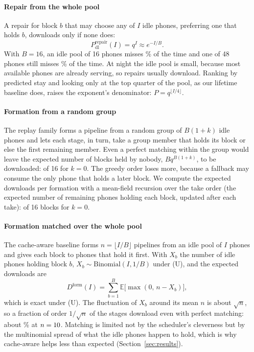\documentclass[preprint,review,12pt,authoryear]{elsarticle}
\begin{document}
\paragraph{Repair from the whole pool} A repair for block $b$ that may choose
any of $I$ idle phones, preferring one that holds $b$, downloads only if none
does:
\begin{equation}
P_{\text{dl}}^{\text{repair}}(I) = q^{I} \approx e^{-I/B}.
\label{eq:repair}
\end{equation}
With $B=16$, an idle pool of 16 phones misses \TMqSixteenPct\% of the time
and one of 48 phones still misses \TMqFortyEightPct\% of the time. At night
the idle pool is small, because most available phones are already serving, so
repairs usually download. Ranking by predicted stay and looking only at the
top quarter of the pool, as our lifetime baseline does, raises the exponent's
denominator: $P = q^{\lfloor I/4 \rfloor}$.

\paragraph{Formation from a random group} The replay family forms a pipeline
from a random group of $B(1+k)$ idle phones and lets each stage, in turn, take
a group member that holds its block or else the first remaining member. Even a
perfect matching within the group would leave the expected number of blocks
held by nobody, $B q^{B(1+k)}$, to be downloaded: \TMFormPerfect{} of 16 for
$k=0$. The greedy order loses more, because a fallback may consume the only
phone that holds a later block. We compute the expected downloads per
formation with a mean-field recursion over the take order (the expected number
of remaining phones holding each block, updated after each take): \TMFormGreedy{}
of 16 blocks for $k=0$.

\paragraph{Formation matched over the whole pool} The cache-aware baseline
forms $n = \lfloor I/B\rfloor$ pipelines from an idle pool of $I$ phones and
gives each block to phones that hold it first. With $X_b$ the number of idle
phones holding block $b$, $X_b \sim \text{Binomial}(I, 1/B)$ under (U), and the
expected downloads are
\begin{equation}
D^{\text{form}}(I) = \sum_{b=1}^{B} \mathbb{E}\bigl[\max(0,\, n - X_b)\bigr],
\label{eq:formcache}
\end{equation}
which is exact under (U). The fluctuation of $X_b$ around its mean $n$ is about
$\sqrt{n}$, so a fraction of order $1/\sqrt{n}$ of the stages download even
with perfect matching: about \TMFormCacheFracPct\% at $n=10$. Matching is
limited not by the scheduler's cleverness but by the multinomial spread of
what the idle phones happen to hold, which is why cache-aware helps less than
expected (Section~\ref{sec:results}).
\end{document}
